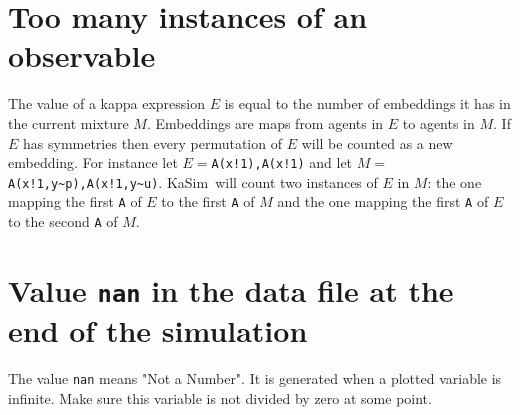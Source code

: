 \documentclass[11pt]{book}
\def\KaSim{\textsf{KaSim}}
\def\intstate{\textasciitilde}
\def\ttt#1{\texttt{#1}}
\begin{document}
\section*{Too many instances of an observable}
The value of a kappa expression $E$  is equal to the number of embeddings it has in the current mixture $M$. Embeddings are maps from agents in $E$  to agents in $M$. If $E$ has symmetries then every permutation of $E$ will be counted as a new embedding. For instance let $E=$\ttt{A(x!1),A(x!1)}  and let $M=$\ttt{A(x!1,y\intstate p),A(x!1,y\intstate u)}.
\KaSim~will count two instances of $E$ in $M$: the one mapping the first \ttt{A} of $E$ to the first \ttt{A} of $M$ and the one mapping the first \ttt{A} of $E$ to the second \ttt{A} of $M$.


\section*{Value \ttt{nan} in the data file at the end of the simulation}
The value \ttt{nan} means "Not a Number". It is generated when a plotted variable is infinite. Make sure this variable is not divided by zero at some point.




\printindex
\end{document}
